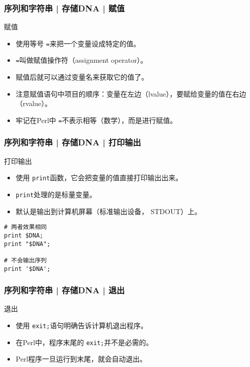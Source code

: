 \begin{frame}[fragile]
  \frametitle{序列和字符串 | 存储DNA | \alert{赋值}}
  \begin{block}{赋值}
    \begin{itemize}
      \item 使用等号 \verb|=|来把一个变量设成特定的值。
      \item \verb|=|叫做赋值操作符（assignment operator）。
      \item 赋值后就可以通过变量名来获取它的值了。
      \item 注意赋值语句中项目的顺序：变量在左边（lvalue），要赋给变量的值在右边（rvalue）。
      \item 牢记在Perl中 \verb|=|不表示相等（数学），而是进行赋值。
    \end{itemize}
  \end{block}
\end{frame}

\begin{frame}[fragile]
  \frametitle{序列和字符串 | 存储DNA | 打印输出}
  \begin{block}{打印输出}
    \begin{itemize}
      \item 使用 \verb|print|函数，它会把变量的值直接打印输出出来。
      \item \verb|print|处理的是标量变量。
      \item 默认是输出到计算机屏幕（标准输出设备， STDOUT）上。
    \end{itemize}
  \end{block}
  \pause
  \vspace{-1.5em}
\begin{lstlisting}
# 两者效果相同
print $DNA;
print "$DNA";

# 不会输出序列
print '$DNA';
\end{lstlisting}
\end{frame}

\begin{frame}[fragile]
  \frametitle{序列和字符串 | 存储DNA | \alert{退出}}
  \begin{block}{退出}
    \begin{itemize}
      \item 使用 \verb|exit;|语句明确告诉计算机退出程序。
      \item 在Perl中，程序末尾的 \verb|exit;|并不是必需的。
      \item Perl程序一旦运行到末尾，就会自动退出。
    \end{itemize}
  \end{block}
\end{frame}

